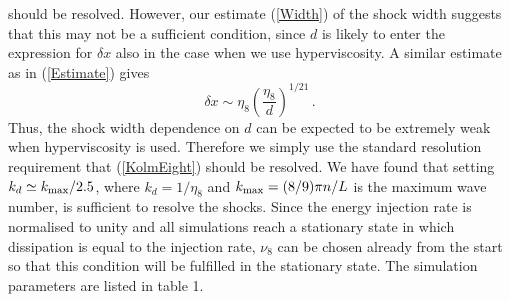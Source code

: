\documentclass{jfm}
\newcommand{\kmax}{k_{\mbox{\scriptsize max}}}
\begin{document}
should be resolved. However, our estimate (\ref{Width}) of the shock width suggests that this may not be a sufficient condition, since $ d $ is likely to enter the expression for $ \delta x $ also in the case when we use hyperviscosity.
A similar estimate as in (\ref{Estimate}) gives
\begin{equation} \label{EtaEight}
\delta x \sim \eta_{8} \left ( \frac{\eta_8}{d} \right)^{1/21} \, .
\end{equation} 
Thus, the shock width dependence on $ d $ can be expected to be extremely weak when hyperviscosity is used. Therefore we simply use the standard resolution requirement that (\ref{KolmEight}) should be resolved. We have found that setting
$  k_{d} \simeq \kmax/ 2.5$, where $ k_{d} = 1/\eta_8 $ and $\kmax =
(8/9)\pi n/L $ is the maximum wave number, is  sufficient to resolve the shocks. Since the energy injection rate is normalised to unity and all simulations reach a stationary state in which dissipation is equal to the injection rate, $ \nu_8 $ can be chosen already from the start so that this condition will be fulfilled in the stationary state. 
 The  simulation parameters are listed in table 1.
\end{document}
